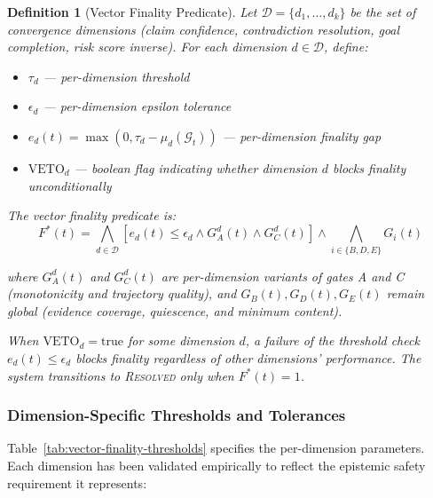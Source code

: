 \documentclass[11pt]{article}
\newtheorem{definition}{Definition}
\begin{document}
\begin{definition}[Vector Finality Predicate]
\label{def:vector-finality}
Let $\mathcal{D} = \{d_1, \ldots, d_k\}$ be the set of convergence dimensions
(claim confidence, contradiction resolution, goal completion, risk score inverse).
For each dimension $d \in \mathcal{D}$, define:
\begin{itemize}
  \item $\tau_d$ — per-dimension threshold
  \item $\epsilon_d$ — per-dimension epsilon tolerance
  \item $e_d(t) = \max(0, \tau_d - \mu_d(\mathcal{G}_t))$ — per-dimension finality gap
  \item $\text{VETO}_d$ — boolean flag indicating whether dimension $d$ blocks finality unconditionally
\end{itemize}

The vector finality predicate is:
\[
F^*(t) = \bigwedge_{d \in \mathcal{D}} \left[ e_d(t) \leq \epsilon_d \wedge G_A^d(t) \wedge G_C^d(t) \right] \wedge \bigwedge_{i \in \{B,D,E\}} G_i(t)
\]

where $G_A^d(t)$ and $G_C^d(t)$ are per-dimension variants of gates A and C (monotonicity and
trajectory quality), and $G_B(t), G_D(t), G_E(t)$ remain global (evidence coverage, quiescence,
and minimum content).

When $\text{VETO}_d = \text{true}$ for some dimension $d$, a failure of the threshold check
$e_d(t) \leq \epsilon_d$ blocks finality regardless of other dimensions' performance. The system
transitions to \textnormal{\textsc{Resolved}} only when $F^*(t) = 1$.
\end{definition}

\subsubsection{Dimension-Specific Thresholds and Tolerances}

Table~\ref{tab:vector-finality-thresholds} specifies the per-dimension parameters. Each dimension
has been validated empirically to reflect the epistemic safety requirement it represents:
\end{document}
